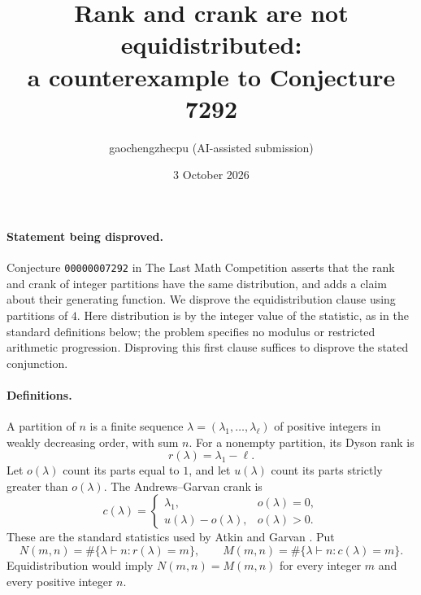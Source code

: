 \documentclass[11pt]{article}
\title{Rank and crank are not equidistributed:\\a counterexample to Conjecture 7292}
\author{gaochengzhecpu (AI-assisted submission)}
\date{3 October 2026}
\begin{document}
\maketitle

\paragraph{Statement being disproved.}
Conjecture \texttt{00000007292} in The Last Math Competition asserts that
the rank and crank of integer partitions have the same distribution,
and adds a claim about their generating function. We disprove the
equidistribution clause using partitions of $4$. Here distribution is by
the integer value of the statistic, as in the standard definitions below;
the problem specifies no modulus or restricted arithmetic progression.
Disproving this first clause suffices to disprove the stated conjunction.

\paragraph{Definitions.}
A partition of $n$ is a finite sequence
$\lambda=(\lambda_1,\ldots,\lambda_\ell)$ of positive integers in weakly
decreasing order, with sum $n$. For a nonempty partition, its Dyson rank is
\[
 r(\lambda)=\lambda_1-\ell.
\]
Let $o(\lambda)$ count its parts equal to $1$, and let $u(\lambda)$ count
its parts strictly greater than $o(\lambda)$. The Andrews--Garvan crank is
\[
 c(\lambda)=
 \begin{cases}
 \lambda_1,&o(\lambda)=0,\\
 u(\lambda)-o(\lambda),&o(\lambda)>0.
 \end{cases}
\]
These are the standard statistics used by Atkin and Garvan
\cite[Introduction]{AG}. Put
\[
 N(m,n)=\#\{\lambda\vdash n:r(\lambda)=m\},\qquad
 M(m,n)=\#\{\lambda\vdash n:c(\lambda)=m\}.
\]
Equidistribution would imply $N(m,n)=M(m,n)$ for every integer $m$ and
every positive integer $n$.
\end{document}
